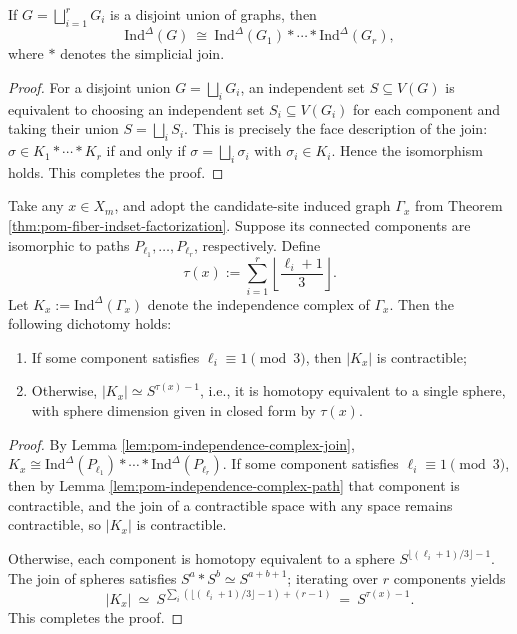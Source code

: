 \begin{lemma}\label{lem:pom-independence-complex-join}
If \(G=\bigsqcup_{i=1}^r G_i\) is a disjoint union of graphs, then
\[
\mathrm{Ind}^{\Delta}(G)\ \cong\ \mathrm{Ind}^{\Delta}(G_1)\ast\cdots\ast \mathrm{Ind}^{\Delta}(G_r),
\]
where \(\ast\) denotes the simplicial join.
\end{lemma}
\begin{proof}
For a disjoint union \(G=\bigsqcup_i G_i\), an independent set \(S\subseteq V(G)\) is equivalent to choosing an independent set \(S_i\subseteq V(G_i)\) for each component and taking their union \(S=\bigsqcup_i S_i\).
This is precisely the face description of the join: \(\sigma\in K_1\ast\cdots\ast K_r\) if and only if \(\sigma=\bigsqcup_i \sigma_i\) with \(\sigma_i\in K_i\).
Hence the isomorphism holds. This completes the proof.
\end{proof}

\begin{theorem}\label{thm:pom-fiber-independence-complex-classification}
Take any \(x\in X_m\), and adopt the candidate-site induced graph
\(\Gamma_x\) from Theorem \ref{thm:pom-fiber-indset-factorization}.
Suppose its connected components are isomorphic to paths \(P_{\ell_1},\dots,P_{\ell_r}\), respectively.
Define
\[
\tau(x):=\sum_{i=1}^r \left\lfloor\frac{\ell_i+1}{3}\right\rfloor.
\]
Let
\(
K_x:=\mathrm{Ind}^{\Delta}(\Gamma_x)
\)
denote the independence complex of \(\Gamma_x\). Then the following dichotomy holds:
\begin{enumerate}
  \item If some component satisfies \(\ell_i\equiv 1\pmod 3\), then \(|K_x|\) is contractible;
  \item Otherwise, \(|K_x|\simeq S^{\tau(x)-1}\), i.e., it is homotopy equivalent to a single sphere, with sphere dimension given in closed form by \(\tau(x)\).
\end{enumerate}
\end{theorem}
\begin{proof}
By Lemma \ref{lem:pom-independence-complex-join},
\(
K_x\cong \mathrm{Ind}^{\Delta}(P_{\ell_1})\ast\cdots\ast \mathrm{Ind}^{\Delta}(P_{\ell_r})
\).
If some component satisfies \(\ell_i\equiv 1\pmod 3\), then by Lemma \ref{lem:pom-independence-complex-path} that component is contractible, and the join of a contractible space with any space remains contractible,
so \(|K_x|\) is contractible.
\par
Otherwise, each component is homotopy equivalent to a sphere \(S^{\lfloor(\ell_i+1)/3\rfloor-1}\).
The join of spheres satisfies
\(
S^{a}\ast S^{b}\simeq S^{a+b+1}
\);
iterating over \(r\) components yields
\[
|K_x|\ \simeq\ S^{\sum_i(\lfloor(\ell_i+1)/3\rfloor-1)+(r-1)}
\ =\ S^{\tau(x)-1}.
\]
This completes the proof.
\end{proof}

